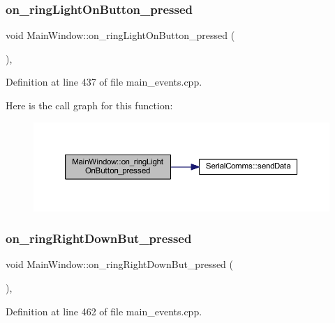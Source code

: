 \subsubsection{\texorpdfstring{on\_ringLightOnButton\_pressed}{on\_ringLightOnButton\_pressed}}
{\footnotesize\ttfamily void Main\+Window\+::on\+\_\+ring\+Light\+On\+Button\+\_\+pressed (\begin{DoxyParamCaption}{ }\end{DoxyParamCaption})\hspace{0.3cm}{\ttfamily [private]}, {\ttfamily [slot]}}



Definition at line 437 of file main\+\_\+events.\+cpp.

Here is the call graph for this function\+:
\nopagebreak
\begin{figure}[H]
\begin{center}
\leavevmode
\includegraphics[width=350pt]{classMainWindow_ac7c8a9d8f85ea41b9017fb13c95c3e79_cgraph}
\end{center}
\end{figure}
\mbox{\label{classMainWindow_a2a0d4d64e7fe2ee99abce8e41eb4afd1}} 
\subsubsection{\texorpdfstring{on\_ringRightDownBut\_pressed}{on\_ringRightDownBut\_pressed}}
{\footnotesize\ttfamily void Main\+Window\+::on\+\_\+ring\+Right\+Down\+But\+\_\+pressed (\begin{DoxyParamCaption}{ }\end{DoxyParamCaption})\hspace{0.3cm}{\ttfamily [private]}, {\ttfamily [slot]}}



Definition at line 462 of file main\+\_\+events.\+cpp.

